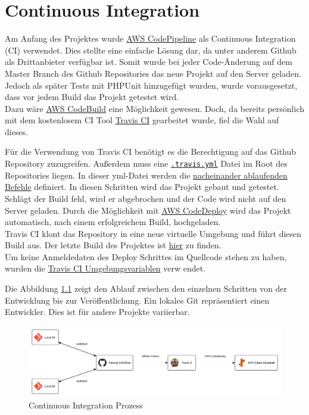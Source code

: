 \chapter{Continuous Integration}\label{ch:continuous-integration}
Am Anfang des Projektes wurde \href{https://aws.amazon.com/de/codepipeline/}{AWS CodePipeline} als Continuous Integration (CI) verwendet. Dies stellte eine einfache Lösung dar, da unter anderem Github als Drittanbieter verfügbar ist. Somit wurde bei jeder Code-Änderung auf dem Master Branch des Github Repositories das neue Projekt auf den Server geladen.\\
Jedoch als später Tests mit PHPUnit hinzugefügt wurden, wurde vorausgesetzt, dass vor jedem Build das Projekt getestet wird.\\
Dazu wäre \href{https://aws.amazon.com/de/codebuild/}{AWS CodeBuild} eine Möglichkeit gewesen. Doch, da bereits persönlich mit dem kostenlosem CI Tool \href{https://travis-ci.com/}{Travis CI} gearbeitet wurde, fiel die Wahl auf dieses.

Für die Verwendung von Travis CI benötigt es die Berechtigung auf das Github Repository zuzugreifen. Außerdem muss eine \href{https://github.com/Drinkler/Planning-Poker/blob/master/.travis.yml}{\lstinline{.travis.yml}} Datei im Root des Repositories liegen. In dieser yml-Datei werden die \href{https://docs.travis-ci.com/user/job-lifecycle/}{nacheinander ablaufenden Befehle} definiert. In diesen Schritten wird das Projekt gebaut und getestet. Schlägt der Build fehl, wird er abgebrochen und der Code wird nicht auf den Server geladen. Durch die Möglichkeit mit \href{https://docs.travis-ci.com/user/deployment/codedeploy/}{AWS CodeDeploy} wird das Projekt automatisch, nach einem erfolgreichem Build, hochgeladen.\\
Travis CI klont das Repository in eine neue virtuelle Umgebung und führt diesen Build aus. Der letzte Build des Projektes ist \href{https://travis-ci.com/github/Drinkler/Planning-Poker}{hier} zu finden.\\
Um keine Anmeldedaten des Deploy Schrittes im Quellcode stehen zu haben, wurden die \href{https://docs.travis-ci.com/user/environment-variables/}{Travis CI Umgebungsvariablen} verw endet.

Die Abbildung \ref{ci} zeigt den Ablauf zwischen den einzelnen Schritten von der Entwicklung bis zur Veröffentlichung. Ein lokales Git repräsentiert einen Entwickler. Dies ist für andere Projekte variierbar.

\begin{figure}[H]
	\centering
  \includegraphics[width=\textwidth]{images/continuous_integration.png}
	\caption{Continuous Integration Prozess}
	\label{ci}
\end{figure}